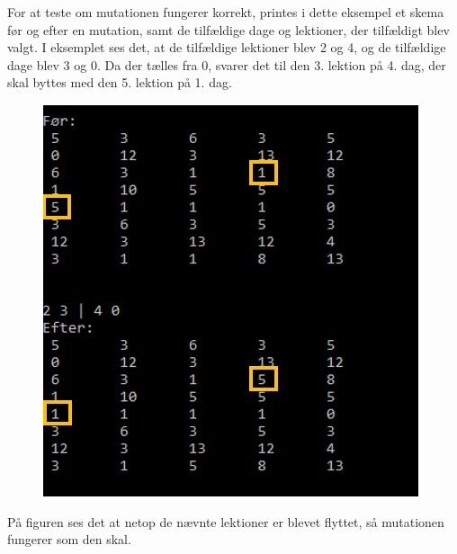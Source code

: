 For at teste om mutationen fungerer korrekt, printes i dette eksempel et skema før og efter en mutation, samt de tilfældige dage og lektioner, der tilfældigt blev valgt. I eksemplet ses det, at de tilfældige lektioner blev 2 og 4, og de tilfældige dage blev 3 og 0. Da der tælles fra 0, svarer det til den 3. lektion på 4. dag, der skal byttes med den 5. lektion på 1. dag.

\begin{figure}[!ht]
\includegraphics[width = \textwidth]{partials/graphics/mutationbevis.png}
\label{fig:mutationsbevis}
\end{figure}

På figuren ses det at netop de nævnte lektioner er blevet flyttet, så mutationen fungerer som den skal.